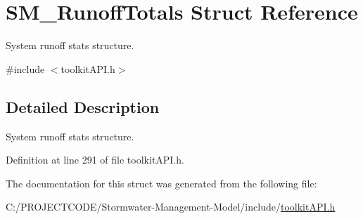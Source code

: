 \hypertarget{struct_s_m___runoff_totals}{}\section{S\+M\+\_\+\+Runoff\+Totals Struct Reference}
\label{struct_s_m___runoff_totals}


System runoff stats structure.  




{\ttfamily \#include $<$toolkit\+A\+P\+I.\+h$>$}



\subsection{Detailed Description}
System runoff stats structure. 

Definition at line 291 of file toolkit\+A\+P\+I.\+h.



The documentation for this struct was generated from the following file\+:\begin{DoxyCompactItemize}
\item 
C\+:/\+P\+R\+O\+J\+E\+C\+T\+C\+O\+D\+E/\+Stormwater-\/\+Management-\/\+Model/include/\hyperlink{toolkit_a_p_i_8h}{toolkit\+A\+P\+I.\+h}\end{DoxyCompactItemize}
